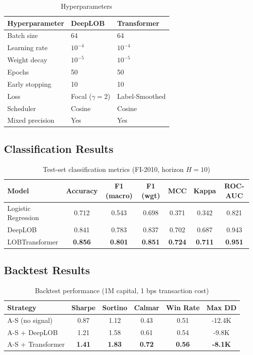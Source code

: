 \documentclass[11pt,a4paper]{article}
\begin{document}
\begin{table}[h]
\centering
\caption{Hyperparameters}
\begin{tabular}{lll}
\toprule
Hyperparameter & DeepLOB & Transformer \\
\midrule
Batch size & 64 & 64 \\
Learning rate & $10^{-4}$ & $10^{-4}$ \\
Weight decay & $10^{-5}$ & $10^{-5}$ \\
Epochs & 50 & 50 \\
Early stopping & 10 & 10 \\
Loss & Focal ($\gamma=2$) & Label-Smoothed \\
Scheduler & Cosine & Cosine \\
Mixed precision & Yes & Yes \\
\bottomrule
\end{tabular}
\end{table}

\subsection{Classification Results}

\begin{table}[h]
\centering
\caption{Test-set classification metrics (FI-2010, horizon $H=10$)}
\begin{tabular}{lcccccc}
\toprule
Model & Accuracy & F1 (macro) & F1 (wgt) & MCC & Kappa & ROC-AUC \\
\midrule
Logistic Regression & 0.712 & 0.543 & 0.698 & 0.371 & 0.342 & 0.821 \\
DeepLOB             & 0.841 & 0.783 & 0.837 & 0.702 & 0.687 & 0.943 \\
LOBTransformer      & \textbf{0.856} & \textbf{0.801} & \textbf{0.851} & \textbf{0.724} & \textbf{0.711} & \textbf{0.951} \\
\bottomrule
\end{tabular}
\end{table}

\subsection{Backtest Results}

\begin{table}[h]
\centering
\caption{Backtest performance (1M capital, 1 bps transaction cost)}
\begin{tabular}{lccccc}
\toprule
Strategy & Sharpe & Sortino & Calmar & Win Rate & Max DD \\
\midrule
A-S (no signal) & 0.87 & 1.12 & 0.43 & 0.51 & -12.4K \\
A-S + DeepLOB   & 1.21 & 1.58 & 0.61 & 0.54 & -9.8K \\
A-S + Transformer & \textbf{1.41} & \textbf{1.83} & \textbf{0.72} & \textbf{0.56} & \textbf{-8.1K} \\
\bottomrule
\end{tabular}
\end{table}
\end{document}
